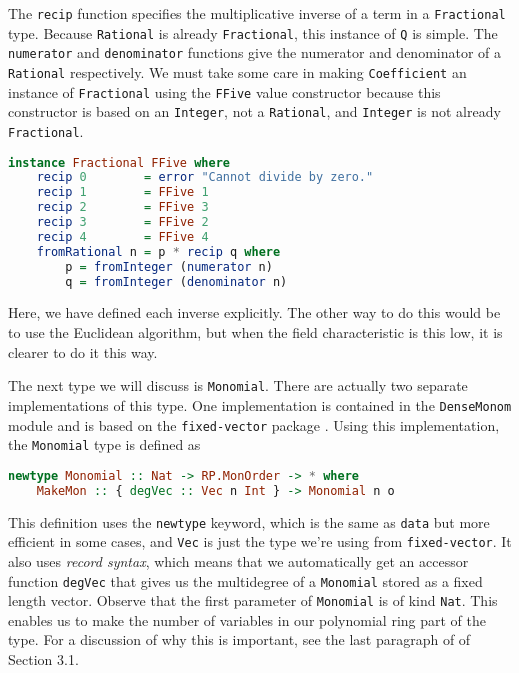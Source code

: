\documentclass[MS, xcolor=dvipsnames]{wfuthesis}
\theoremstyle{definition}
\begin{document}
The \lstinline{recip} function specifies the multiplicative inverse of a term in a \lstinline{Fractional} type. Because \lstinline{Rational} is already \lstinline{Fractional}, this instance of \lstinline{Q} is simple. The \lstinline{numerator} and \lstinline{denominator} functions give the numerator and denominator of a \lstinline{Rational} respectively. We must take some care in making \lstinline{Coefficient} an instance of \lstinline{Fractional} using the \lstinline{FFive} value constructor because this constructor is based on an \lstinline{Integer}, not a \lstinline{Rational}, and \lstinline{Integer} is not already \lstinline{Fractional}.
\begin{lstlisting}[language=Haskell]
instance Fractional FFive where
    recip 0        = error "Cannot divide by zero."
    recip 1        = FFive 1
    recip 2        = FFive 3
    recip 3        = FFive 2
    recip 4        = FFive 4
    fromRational n = p * recip q where
        p = fromInteger (numerator n)
        q = fromInteger (denominator n)
\end{lstlisting}
Here, we have defined each inverse explicitly. The other way to do this would be to use the Euclidean algorithm, but when the field characteristic is this low, it is clearer to do it this way. \par
The next type we will discuss is \lstinline{Monomial}. There are actually two separate implementations of this type. One implementation is contained in the \lstinline{DenseMonom} module and is based on the \lstinline{fixed-vector} package \cite{Shimuuar}. Using this implementation, the \lstinline{Monomial} type is defined as
\begin{lstlisting}[language=Haskell]
newtype Monomial :: Nat -> RP.MonOrder -> * where
    MakeMon :: { degVec :: Vec n Int } -> Monomial n o
\end{lstlisting}
This definition uses the \lstinline{newtype} keyword, which is the same as \lstinline{data} but more efficient in some cases, and \lstinline{Vec} is just the type we're using from \lstinline{fixed-vector}. It also uses \emph{record syntax}, which means that we automatically get an accessor function \lstinline{degVec} that gives us the multidegree of a \lstinline{Monomial} stored as a fixed length vector. Observe that the first parameter of \lstinline{Monomial} is of kind \lstinline{Nat}. This enables us to make the number of variables in our polynomial ring part of the type. For a discussion of why this is important, see the last paragraph of of Section 3.1. \par
\end{document}
